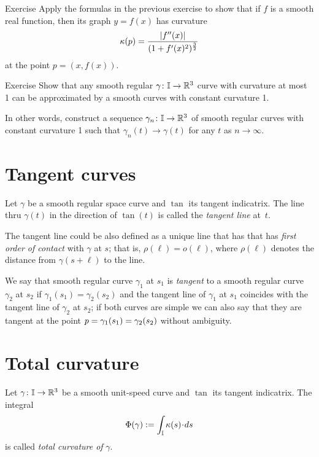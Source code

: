\begin{thm}{Exercise}\label{ex:curvature-graph}
Apply the formulas in the previous exercise to show that if $f$ is a smooth real function,
then its graph $y=f(x)$  has curvature
\[\kappa(p)=\frac{|f''(x)|}{(1+f'(x)^2)^{\frac32}}\]
at the point $p=(x,f(x))$.
\end{thm}

\begin{thm}{Exercise}\label{ex:approximation-const-curvature}
Show that any smooth regular $\gamma\colon\mathbb{I}\to\mathbb{R}^3$ curve with curvature at most 1 can be approximated by a smooth curves with constant curvature 1.

In other words, construct a sequence $\gamma_n\colon\mathbb{I}\to\mathbb{R}^3$ of smooth regular curves  with constant curvature 1 such that $\gamma_n(t)\to \gamma(t)$ for any $t$ as $n\to\infty$.
\end{thm}


\section{Tangent curves}

Let $\gamma$ be a smooth regular space curve and $\tan$ its tangent indicatrix.
The line thru $\gamma(t)$ in the direction of $\tan(t)$ is called the \emph{tangent line} at~$t$.

The tangent line could be also defined as a unique line that has that has \emph{first order of contact} with $\gamma$ at $s$;
that is, $\rho(\ell)=o(\ell)$, where $\rho(\ell)$ denotes the distance from $\gamma(s+\ell)$ to the line.

We say that smooth regular curve $\gamma_1$ at $s_1$ is \emph{tangent} to a smooth regular curve $\gamma_2$ at $s_2$
if $\gamma_1(s_1)=\gamma_2(s_2)$ and the tangent line of $\gamma_1$ at $s_1$ coincides with the tangent line of $\gamma_2$ at $s_2$;
if both curves are simple we can also say that they are tangent at the point $p=\gamma_1(s_1)\z=\gamma_2(s_2)$ without ambiguity.


\section{Total curvature}

Let $\gamma\colon\mathbb{I}\to\mathbb{R}^3$ be a smooth unit-speed curve and $\tan$ its tangent indicatrix.
The integral 
\[\tc\gamma:=\int_{\mathbb{I}}\kur(s)\cdot ds\]
is called \emph{total curvature of}\label{page:total curvature of:smooth-def}
$\gamma$.

